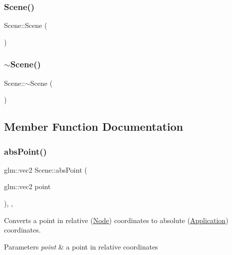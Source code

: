 \subsubsection{\texorpdfstring{Scene()}{Scene()}}
{\footnotesize\ttfamily Scene\+::\+Scene (\begin{DoxyParamCaption}{ }\end{DoxyParamCaption})}

\mbox{\label{classsage_1_1Scene_a3b8cec2e32546713915f8c6303c951f1}} 
\subsubsection{\texorpdfstring{$\sim$Scene()}{~Scene()}}
{\footnotesize\ttfamily Scene\+::$\sim$\+Scene (\begin{DoxyParamCaption}{ }\end{DoxyParamCaption})}



\subsection{Member Function Documentation}
\mbox{\label{classsage_1_1Scene_a97d7d623cc44062249a199c63c67b5be}} 
\subsubsection{\texorpdfstring{absPoint()}{absPoint()}}
{\footnotesize\ttfamily glm\+::vec2 Scene\+::abs\+Point (\begin{DoxyParamCaption}\item[{glm\+::vec2}]{point }\end{DoxyParamCaption})\hspace{0.3cm}{\ttfamily [override]}, {\ttfamily [protected]}, {\ttfamily [virtual]}}



Converts a point in relative (\mbox{\hyperlink{classsage_1_1Node}{Node}}) coordinates to absolute (\mbox{\hyperlink{classsage_1_1Application}{Application}}) coordinates. 


\begin{DoxyParams}{Parameters}
{\em point} & a point in relative coordinates \\
\hline
\end{DoxyParams}


